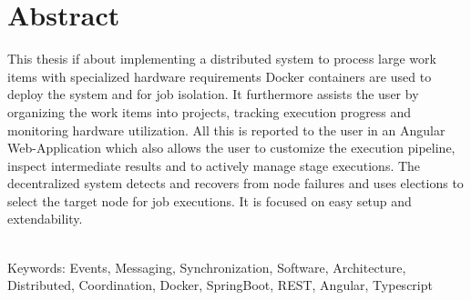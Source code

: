 
\chapter*{Abstract} %

 


This thesis if about implementing a distributed system to process large work items with specialized hardware requirements
Docker containers are used to deploy the system and for job isolation.
It furthermore assists the user by organizing the work items into projects, tracking execution progress and monitoring hardware utilization.
All this is reported to the user in an Angular Web-Application which also allows the user to customize the execution pipeline, inspect intermediate results and to actively manage stage executions.
The decentralized system detects and recovers from node failures and uses elections to select the target node for job executions.
It is focused on easy setup and extendability.

~\\
Keywords: Events, Messaging, Synchronization, Software, Architecture, Distributed, Coordination, Docker, SpringBoot, REST, Angular, Typescript